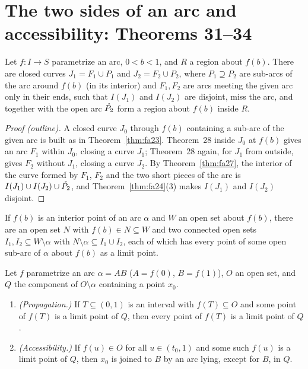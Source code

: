 
\section{The two sides of an arc and accessibility: Theorems 31--34}

\begin{theorem}\label{thm:fa31}
Let $f\colon I\to S$ parametrize an arc, $0<b<1$, and $R$ a region about $f(b)$. There are closed curves $J_1=F_1\cup P_1$
and $J_2=F_2\cup P_2$, where $P_1\supseteq P_2$ are sub-arcs of the arc around $f(b)$ (in its interior) and $F_1,F_2$ are
arcs meeting the given arc only in their ends, such that $I(J_1)$ and $I(J_2)$ are disjoint, miss the arc, and together
with the open arc $\mathring{P_2}$ form a region about $f(b)$ inside $R$.
\end{theorem}

\begin{proof}[Proof (outline)]
A closed curve $J_0$ through $f(b)$ containing a sub-arc of the given arc is built as in Theorem~\ref{thm:fa23}. Theorem~28
inside $J_0$ at $f(b)$ gives an arc $F_1$ within $J_0$, closing a curve $J_1$; Theorem~28 again, for $J_1$ from outside,
gives $F_2$ without $J_1$, closing a curve $J_2$. By Theorem~\ref{thm:fa27}, the interior of the curve formed by $F_1$, $F_2$
and the two short pieces of the arc is $I(J_1)\cup I(J_2)\cup\mathring{P_2}$, and Theorem~\ref{thm:fa24}(3) makes $I(J_1)$ and
$I(J_2)$ disjoint.
\end{proof}


\begin{corollary}\label{cor:sides}
If $f(b)$ is an interior point of an arc $\alpha$ and $W$ an open set about $f(b)$, there are an open set $N$ with $f(b)\in
N\subseteq W$ and two connected open sets $I_1,I_2\subseteq W\setminus\alpha$ with $N\setminus\alpha\subseteq I_1\cup I_2$, each of
which has every point of some open sub-arc of $\alpha$ about $f(b)$ as a limit point.
\end{corollary}


\begin{theorem}\label{thm:fa32}
Let $f$ parametrize an arc $\alpha=AB$ ($A=f(0)$, $B=f(1)$), $O$ an open set, and $Q$ the component of $O\setminus\alpha$
containing a point $x_0$.
\begin{enumerate}[label=(\alph*)]
\item \emph{(Propagation.)} If $T\subseteq(0,1)$ is an interval with $f(T)\subseteq O$ and some point of $f(T)$ is a limit point
of $Q$, then every point of $f(T)$ is a limit point of $Q$.
\item \emph{(Accessibility.)} If $f(u)\in O$ for all $u\in(t_0,1)$ and some such $f(u)$ is a limit point of $Q$, then $x_0$ is
joined to $B$ by an arc lying, except for $B$, in $Q$.
\end{enumerate}
\end{theorem}

